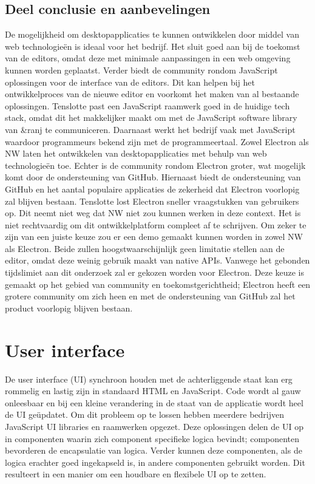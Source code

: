 \subsection{Deel conclusie en aanbevelingen}
De mogelijkheid om desktopapplicaties te kunnen ontwikkelen door middel van web technologieën is ideaal voor het bedrijf. Het sluit goed aan bij de toekomst van de editors, omdat deze met minimale aanpassingen in een web omgeving kunnen worden geplaatst. Verder biedt de community rondom JavaScript oplossingen voor de interface van de editors. Dit kan helpen bij het ontwikkelproces van de nieuwe editor en voorkomt het maken van al bestaande oplossingen. Tenslotte past een JavaScript raamwerk goed in de huidige tech stack, omdat dit het makkelijker maakt om met de JavaScript software library van \&ranj te communiceren. Daarnaast werkt het bedrijf vaak met JavaScript waardoor programmeurs bekend zijn met de programmeertaal.
Zowel Electron als NW laten het ontwikkelen van desktopapplicaties met behulp van web technologieën toe. Echter is de community rondom Electron groter, wat mogelijk komt door de ondersteuning van GitHub. Hiernaast biedt de ondersteuning van GitHub en het aantal populaire applicaties de zekerheid dat Electron voorlopig zal blijven bestaan. Tenslotte lost Electron sneller vraagstukken van gebruikers op.
Dit neemt niet weg dat NW niet zou kunnen werken in deze context. Het is niet rechtvaardig om dit ontwikkelplatform compleet af te schrijven. Om zeker te zijn van een juiste keuze zou er een demo gemaakt kunnen worden in zowel NW als Electron. Beide zullen hoogstwaarschijnlijk geen limitatie stellen aan de editor, omdat deze weinig gebruik maakt van native APIs. Vanwege het gebonden tijdslimiet aan dit onderzoek zal er gekozen worden voor Electron. Deze keuze is gemaakt op het gebied van community en toekomstgerichtheid; Electron heeft een grotere community om zich heen en met de ondersteuning van GitHub zal het product voorlopig blijven bestaan.

\section{User interface}
De user interface (UI) synchroon houden met de achterliggende staat kan erg rommelig en lastig zijn in standaard HTML en JavaScript. Code wordt al gauw onleesbaar en bij een kleine verandering in de staat van de applicatie wordt heel de UI geüpdatet. Om dit probleem op te lossen hebben meerdere bedrijven JavaScript UI libraries en raamwerken opgezet. Deze oplossingen delen de UI op in componenten waarin zich component specifieke logica bevindt; componenten bevorderen de encapsulatie van logica. Verder kunnen deze componenten, als de logica erachter goed ingekapseld is, in andere componenten gebruikt worden. Dit resulteert in een manier om een houdbare en flexibele UI op te zetten.

